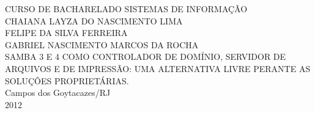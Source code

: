 \begin{titlepage}
 \begin{figure}[ht]
 \centering
 \end{figure}
 \begin{center}
   {\large CURSO DE BACHARELADO SISTEMAS DE INFORMAÇÃO} \\ [3.5cm]
  	{\large CHAIANA LAYZA DO NASCIMENTO LIMA} \\
	{\large FELIPE DA SILVA FERREIRA} \\	
	{\large GABRIEL NASCIMENTO MARCOS DA ROCHA} \\ [4cm]
   	{\large SAMBA 3 E 4 COMO CONTROLADOR DE DOMÍNIO, SERVIDOR DE ARQUIVOS E DE IMPRESSÃO: UMA ALTERNATIVA LIVRE PERANTE AS SOLUÇÕES PROPRIETÁRIAS.}\\ [2cm]
	\vfill
   {\large Campos dos Goytacazes/RJ} \\
   {\large 2012}
 \end{center}
\end{titlepage}

